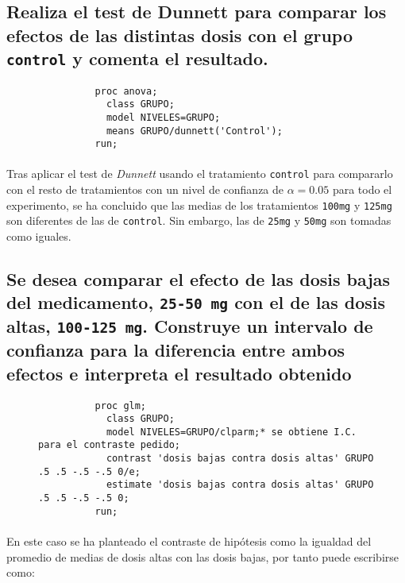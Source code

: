 \documentclass{article}
\begin{document}
    \subsection{Realiza el test de Dunnett para comparar los efectos de las distintas dosis con el grupo \texttt{control} y comenta el resultado.}

      \begin{figure}[h]
        \centering
        \begin{verbatim}
          proc anova;
            class GRUPO;
            model NIVELES=GRUPO;
            means GRUPO/dunnett('Control');
          run;
        \end{verbatim}
        \label{code:sas_6}
      \end{figure}

      \paragraph{}
      Tras aplicar el test de \emph{Dunnett} usando el tratamiento \texttt{control} para compararlo con el resto de tratamientos con un nivel de confianza de $\alpha=0.05$ para todo el experimento, se ha concluido que las medias de los tratamientos \texttt{100mg} y \texttt{125mg} son diferentes de las de \texttt{control}. Sin embargo, las de \texttt{25mg} y \texttt{50mg} son tomadas como iguales.


    \subsection{Se desea comparar el efecto de las dosis bajas del medicamento, \texttt{25-50 mg} con el de las dosis altas, \texttt{100-125 mg}. Construye un intervalo de confianza para la diferencia entre ambos efectos e interpreta el resultado obtenido}

      \begin{figure}[h]
        \centering
        \begin{verbatim}
          proc glm;
            class GRUPO;
            model NIVELES=GRUPO/clparm;* se obtiene I.C. para el contraste pedido;
            contrast 'dosis bajas contra dosis altas' GRUPO .5 .5 -.5 -.5 0/e;
            estimate 'dosis bajas contra dosis altas' GRUPO .5 .5 -.5 -.5 0;
          run;
        \end{verbatim}
        \label{code:sas_7}
      \end{figure}

      \paragraph{}
      En este caso se ha planteado el contraste de hipótesis como la igualdad del promedio de medias de dosis altas con las dosis bajas, por tanto puede escribirse como:
\end{document}
